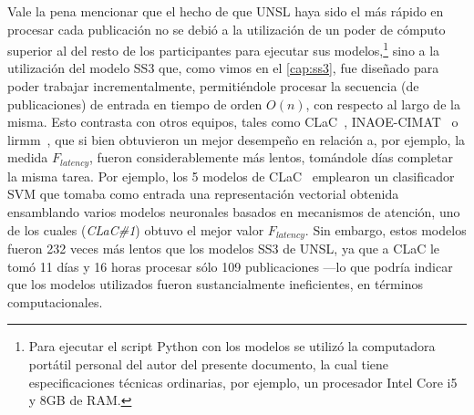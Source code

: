 \begin{itemize}
    Vale la pena mencionar que el hecho de que UNSL haya sido el más rápido en procesar cada publicación no se debió a la utilización de un poder de cómputo superior al del resto de los participantes para ejecutar sus modelos,\footnote{Para ejecutar el script Python con los modelos se utilizó la computadora portátil personal del autor del presente documento, la cual tiene especificaciones técnicas ordinarias, por ejemplo, un procesador Intel Core i5 y 8GB de RAM.} sino a la utilización del modelo SS3 que, como vimos en el \autoref{cap:ss3}, fue diseñado para poder trabajar incrementalmente, permitiéndole procesar la secuencia (de publicaciones) de entrada en tiempo de orden $O(n)$, con respecto al largo de la misma.
    Esto contrasta con otros equipos, tales como CLaC~\cite{mohammadi2019quick}, INAOE-CIMAT~\cite{aragon2019inaoe} o lirmm~\cite{ragheb2019attentive}, que si bien obtuvieron un mejor desempeño en relación a, por ejemplo, la medida $F_{latency}$, fueron considerablemente más lentos, tomándole días completar la misma tarea.
    Por ejemplo, los 5 modelos de CLaC~\cite{mohammadi2019quick} emplearon un clasificador \ac{SVM} que tomaba como entrada una representación vectorial obtenida ensamblando varios modelos neuronales basados en mecanismos de atención, uno de los cuales (\emph{CLaC\#1}) obtuvo el mejor valor $F_{latency}$.
    Sin embargo, estos modelos fueron 232 veces más lentos que los modelos SS3 de UNSL, ya que a CLaC le tomó 11 días y 16 horas procesar sólo 109 publicaciones ---lo que podría indicar que los modelos utilizados fueron sustancialmente ineficientes, en términos computacionales. %



\end{itemize}
